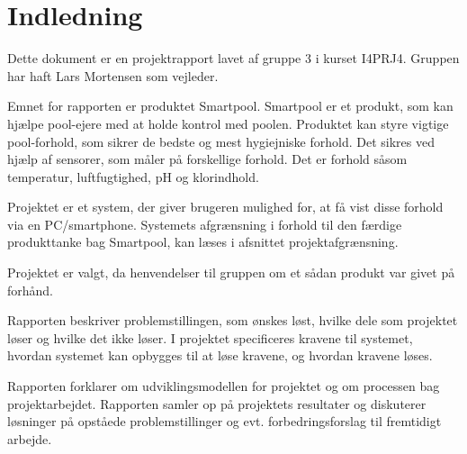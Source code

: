 \chapter{Indledning}





Dette dokument er en projektrapport lavet af gruppe 3 i kurset I4PRJ4. Gruppen har haft Lars Mortensen som vejleder. 

Emnet for rapporten er produktet Smartpool. Smartpool er et produkt, som kan hjælpe pool-ejere med at holde kontrol med poolen. Produktet kan styre vigtige pool-forhold, som sikrer de bedste og mest hygiejniske forhold. Det sikres ved hjælp af sensorer, som måler på forskellige forhold. Det er forhold såsom temperatur, luftfugtighed, pH og klorindhold. 

Projektet er et system, der giver brugeren mulighed for, at få vist disse forhold via en PC/smartphone. Systemets afgrænsning i forhold til den færdige produkttanke bag Smartpool, kan læses i afsnittet projektafgrænsning.

Projektet er valgt, da henvendelser til gruppen om et sådan produkt var givet på forhånd. 

Rapporten beskriver problemstillingen, som ønskes løst, hvilke dele som projektet løser og hvilke det ikke løser. I projektet specificeres kravene til systemet, hvordan systemet kan opbygges til at løse kravene, og hvordan kravene løses. 

Rapporten forklarer om udviklingsmodellen for projektet og om processen bag projektarbejdet. Rapporten samler op på projektets resultater og diskuterer løsninger på opståede problemstillinger og evt. forbedringsforslag til fremtidigt arbejde. 

